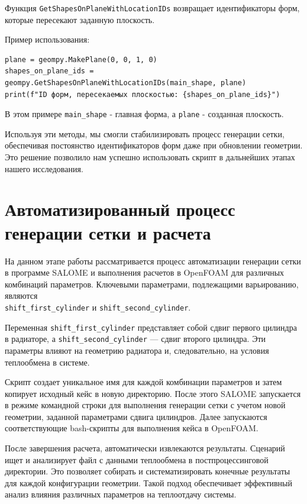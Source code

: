 \documentclass[a4paper,12pt]{article}
\theoremstyle{plain} %
\theoremstyle{definition} %
\theoremstyle{remark} %
\begin{document}
Функция \texttt{GetShapesOnPlaneWithLocationIDs} возвращает идентификаторы форм, которые пересекают заданную плоскость.

Пример использования:
\begin{verbatim}
plane = geompy.MakePlane(0, 0, 1, 0)
shapes_on_plane_ids = geompy.GetShapesOnPlaneWithLocationIDs(main_shape, plane)
print(f"ID форм, пересекаемых плоскостью: {shapes_on_plane_ids}")
\end{verbatim}

В этом примере \texttt{main\_shape} - главная форма, а \texttt{plane} - созданная плоскость.

Используя эти методы, мы смогли стабилизировать процесс генерации сетки, обеспечивая постоянство идентификаторов форм даже при обновлении геометрии. Это решение позволило нам успешно использовать скрипт в дальнейших этапах нашего исследования.

\section{Автоматизированный процесс генерации сетки и расчета}

На данном этапе работы рассматривается процесс автоматизации генерации сетки в программе SALOME и выполнения расчетов в OpenFOAM для различных комбинаций параметров. Ключевыми параметрами, подлежащими варьированию, являются \\ \texttt{shift\_first\_cylinder} и \texttt{shift\_second\_cylinder}.

Переменная \texttt{shift\_first\_cylinder} представляет собой сдвиг первого цилиндра в радиаторе, а \texttt{shift\_second\_cylinder} — сдвиг второго цилиндра. Эти параметры влияют на геометрию радиатора и, следовательно, на условия теплообмена в системе.

Скрипт создает уникальное имя для каждой комбинации параметров и затем копирует исходный кейс в новую директорию. После этого SALOME запускается в режиме командной строки для выполнения генерации сетки с учетом новой геометрии, заданной параметрами сдвига цилиндров. Далее запускаются соответствующие bash-скрипты для выполнения кейса в OpenFOAM.

После завершения расчета, автоматически извлекаются результаты. Сценарий ищет и анализирует файл с данными теплообмена в постпроцессинговой директории. Это позволяет собирать и систематизировать конечные результаты для каждой конфигурации геометрии. Такой подход обеспечивает эффективный анализ влияния различных параметров на теплоотдачу системы.
\end{document}
